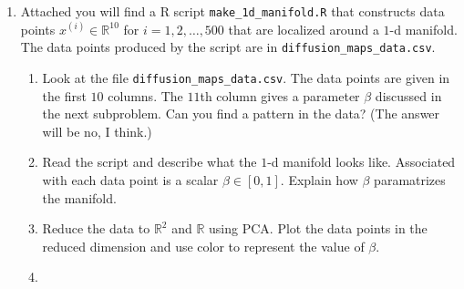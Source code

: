\documentclass{article}
\begin{document}
\begin{enumerate}

\item Attached you will find a R script \verb+make_1d_manifold.R+ that constructs data points $x^{(i)} \in \mathbb{R}^{10}$ for $i=1,2,\dots,500$ that are localized around a $1$-d manifold.   The data points produced by the script are in \verb+diffusion_maps_data.csv+.
\begin{enumerate}
\item Look at the file \verb+diffusion_maps_data.csv+.  The data points are given in the first $10$ columns.  The $11$th column gives a parameter $\beta$ discussed in the next subproblem.   Can you find a pattern in the data?  (The answer will be no, I think.)
\item Read the script and describe what the $1$-d manifold looks like.  Associated with each data point is a scalar $\beta \in [0,1]$.  Explain how $\beta$ paramatrizes the manifold.
\item Reduce the data to $\mathbb{R}^2$ and $\mathbb{R}$ using PCA.  Plot the data points in the reduced dimension and use color to represent the value of $\beta$.  
\item


\end{enumerate}
\end{enumerate}
\end{document}

